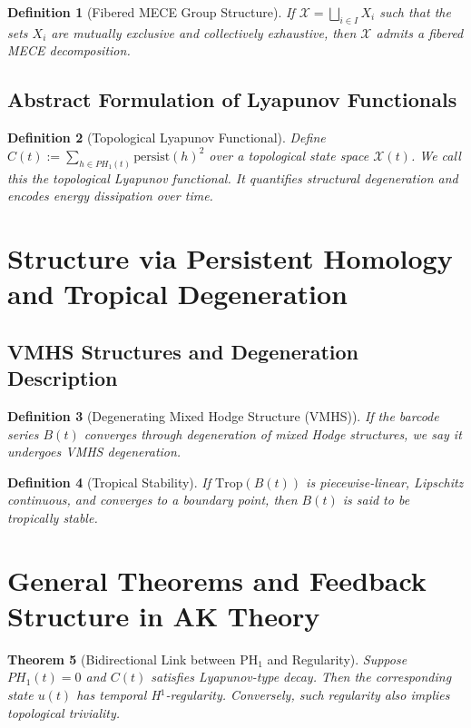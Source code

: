 \documentclass[11pt]{article}
\newtheorem{theorem}{Theorem}[section]
\newtheorem{definition}[theorem]{Definition}
\begin{document}
\begin{definition}[Fibered MECE Group Structure]
If \(\mathcal{X} = \bigsqcup_{i \in I} X_i\) such that the sets \(X_i\) are mutually exclusive and collectively exhaustive, then \(\mathcal{X}\) admits a fibered MECE decomposition.
\end{definition}

\subsection{Abstract Formulation of Lyapunov Functionals}
\begin{definition}[Topological Lyapunov Functional]
Define \(C(t) := \sum_{h\in PH_1(t)} \text{persist}(h)^2\) over a topological state space \(\mathcal{X}(t)\). We call this the topological Lyapunov functional. It quantifies structural degeneration and encodes energy dissipation over time.
\end{definition}

\section{Structure via Persistent Homology and Tropical Degeneration}
\subsection{VMHS Structures and Degeneration Description}
\begin{definition}[Degenerating Mixed Hodge Structure (VMHS)]
If the barcode series \(B(t)\) converges through degeneration of mixed Hodge structures, we say it undergoes VMHS degeneration.
\end{definition}

\begin{definition}[Tropical Stability]
If \(\text{Trop}(B(t))\) is piecewise-linear, Lipschitz continuous, and converges to a boundary point, then \(B(t)\) is said to be tropically stable.
\end{definition}

\section{General Theorems and Feedback Structure in AK Theory}
\begin{theorem}[Bidirectional Link between PH\(_1\) and Regularity]
Suppose \(PH_1(t) = 0\) and \(C(t)\) satisfies Lyapunov-type decay. Then the corresponding state \(u(t)\) has temporal H\(^1\)-regularity. Conversely, such regularity also implies topological triviality.
\end{theorem}
\end{document}

